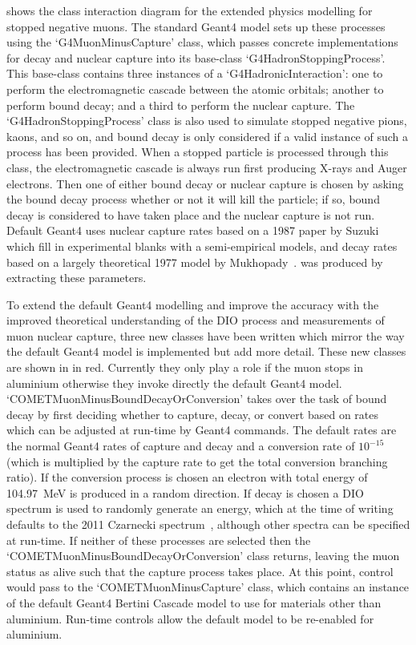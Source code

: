  shows the class interaction diagram for the extended physics modelling for stopped negative muons.
The standard Geant4 model sets up these processes using the `G4MuonMinusCapture' class, which passes concrete implementations for decay and nuclear capture into its base-class `G4HadronStoppingProcess'.
This base-class contains three instances of a `G4HadronicInteraction': one to perform the electromagnetic cascade between the atomic orbitals; another to perform bound decay; and a third to perform the nuclear capture.
The `G4HadronStoppingProcess' class is also used to simulate stopped negative pions, kaons, and so on, and bound decay is only considered if a valid instance of such a process has been provided.
When a stopped particle is processed through this class, the electromagnetic cascade is always run first producing X-rays and Auger electrons.
Then one of either bound decay or nuclear capture is chosen by asking the bound decay process whether or not it will kill the particle; if so, bound decay is considered to have taken place and the nuclear capture is not run. 
Default Geant4 uses nuclear capture rates based on a 1987 paper by Suzuki \etal~\cite{Suzuki1987}  which fill in experimental blanks with a semi-empirical models, and decay rates based on a largely theoretical 1977 model by Mukhopady~\cite{Mukhopady:1976hu}.
 was produced by extracting these parameters.

\FigSimulationPhysicsClasses
To extend the default Geant4 modelling and improve the accuracy with the improved theoretical understanding of the \ac{DIO} process and measurements of muon nuclear capture, three new classes have been written which mirror the way the default Geant4 model is implemented but add more detail.
These new classes are shown in  in red.  
Currently they only play a role if the muon stops in aluminium otherwise they invoke directly the default Geant4 model.
`COMETMuonMinusBoundDecayOrConversion' takes over the task of bound decay by first deciding whether to capture, decay, or convert based on rates which can be adjusted at run-time by Geant4 commands.
The default rates are the normal Geant4 rates of capture and decay and a conversion rate of $10^{-15}$ (which is multiplied by the capture rate to get the total conversion branching ratio).
If the conversion process is chosen an electron with total energy of 104.97~MeV is produced in a random direction.  
If decay is chosen a \ac{DIO} spectrum is used to randomly generate an energy, which at the time of writing defaults to the 2011 Czarnecki spectrum~\cite{Czarnecki2011}, although other spectra can be specified at run-time.
If neither of these processes are selected then the `COMETMuonMinusBoundDecayOrConversion' class returns, leaving the muon status as alive such that the capture process takes place.
At this point, control would pass to the `COMETMuonMinusCapture' class, which contains an instance of the default Geant4 Bertini Cascade model to use for materials other than aluminium.
Run-time controls allow the default model to be re-enabled for aluminium.

